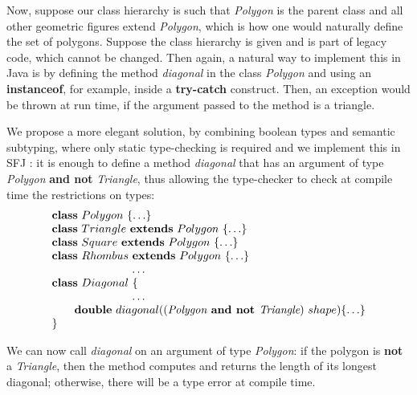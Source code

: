 \documentclass[runningheads]{llncs}
\begin{document}
\begin{example}[Polygons]
    Now, suppose our class hierarchy is such that \emph{Polygon} is the parent class and all other geometric figures extend \emph{Polygon}, which is how one would naturally define the set of polygons.
    Suppose the class hierarchy is given and is part of legacy code, which cannot be changed.
    Then again, a natural way to implement this in Java is by defining the method \emph{diagonal} in the class \emph{Polygon} and using an \textbf{instanceof}, for example, inside a \textbf{try-catch} construct.
    Then, an exception would be thrown at run time, if the argument passed to the method is a triangle.

    We propose a more elegant solution, by combining boolean types and semantic subtyping, where only static type-checking is required and we implement this in SFJ \cite{UD20}: it is enough to define a method \emph{diagonal} that has an argument of type \emph{Polygon} \textbf{and not} \emph{Triangle}, thus allowing the type-checker to check at compile time the restrictions on types:
    \begin{equation*}
        \begin{array}{l}
            \mathbf{class} \  Polygon \ \{\ldots\}
            \\
            \mathbf{class} \  Triangle \ \mathbf{extends }\  Polygon\ \{\ldots\}
            \\
            \mathbf{class} \  Square \ \mathbf{extends }\  Polygon\ \{\ldots\}
            \\
            \mathbf{class} \  Rhombus \ \mathbf{extends }\  Polygon\ \{\ldots\}
            \\
            \hspace{2.5cm} \ldots
            \\
            \mathbf{class} \  Diagonal \ \{
            \\
            \hspace{2.5cm} \ldots \\
            \qquad \mathbf{double}\ diagonal((\textit{Polygon} \textbf{ and not }  \textit{Triangle}) \ shape)\{\ldots\}
            \\
            \}
        \end{array}
    \end{equation*}

    We can now call \emph{diagonal} on an argument of type \emph{Polygon}: if the polygon is \textbf{not} a \emph{Triangle}, then the method computes and returns the length of its longest diagonal; otherwise, there will be a type error at compile time.
\end{example}
\end{document}
